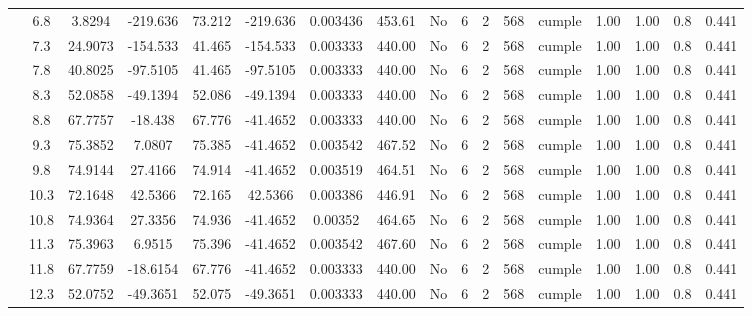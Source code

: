 \begin{table}[H]
{\begin{tabular}{|c|c|c|c|c|c|c|c|c|c|c|c|c|c|c|c|c|}
\cline{2-17}        & 6.8 & 3.8294 & -219.636 & 73.212 & -219.636 & 0.003436 & 453.61 & No  & 6   & 2   & 568 & \cellcolor[rgb]{ .776,  .937,  .808}cumple & 1.00 & 1.00 & 0.8 & 0.441 \bigstrut\\
\cline{2-17}        & 7.3 & 24.9073 & -154.533 & 41.465 & -154.533 & 0.003333 & 440.00 & No  & 6   & 2   & 568 & \cellcolor[rgb]{ .776,  .937,  .808}cumple & 1.00 & 1.00 & 0.8 & 0.441 \bigstrut\\
\cline{2-17}        & 7.8 & 40.8025 & -97.5105 & 41.465 & -97.5105 & 0.003333 & 440.00 & No  & 6   & 2   & 568 & \cellcolor[rgb]{ .776,  .937,  .808}cumple & 1.00 & 1.00 & 0.8 & 0.441 \bigstrut\\
\cline{2-17}        & 8.3 & 52.0858 & -49.1394 & 52.086 & -49.1394 & 0.003333 & 440.00 & No  & 6   & 2   & 568 & \cellcolor[rgb]{ .776,  .937,  .808}cumple & 1.00 & 1.00 & 0.8 & 0.441 \bigstrut\\
\cline{2-17}        & 8.8 & 67.7757 & -18.438 & 67.776 & -41.4652 & 0.003333 & 440.00 & No  & 6   & 2   & 568 & \cellcolor[rgb]{ .776,  .937,  .808}cumple & 1.00 & 1.00 & 0.8 & 0.441 \bigstrut\\
\cline{2-17}        & 9.3 & 75.3852 & 7.0807 & 75.385 & -41.4652 & 0.003542 & 467.52 & No  & 6   & 2   & 568 & \cellcolor[rgb]{ .776,  .937,  .808}cumple & 1.00 & 1.00 & 0.8 & 0.441 \bigstrut\\
\cline{2-17}        & 9.8 & 74.9144 & 27.4166 & 74.914 & -41.4652 & 0.003519 & 464.51 & No  & 6   & 2   & 568 & \cellcolor[rgb]{ .776,  .937,  .808}cumple & 1.00 & 1.00 & 0.8 & 0.441 \bigstrut\\
\cline{2-17}        & 10.3 & 72.1648 & 42.5366 & 72.165 & 42.5366 & 0.003386 & 446.91 & No  & 6   & 2   & 568 & \cellcolor[rgb]{ .776,  .937,  .808}cumple & 1.00 & 1.00 & 0.8 & 0.441 \bigstrut\\
\cline{2-17}        & 10.8 & 74.9364 & 27.3356 & 74.936 & -41.4652 & 0.00352 & 464.65 & No  & 6   & 2   & 568 & \cellcolor[rgb]{ .776,  .937,  .808}cumple & 1.00 & 1.00 & 0.8 & 0.441 \bigstrut\\
\cline{2-17}        & 11.3 & 75.3963 & 6.9515 & 75.396 & -41.4652 & 0.003542 & 467.60 & No  & 6   & 2   & 568 & \cellcolor[rgb]{ .776,  .937,  .808}cumple & 1.00 & 1.00 & 0.8 & 0.441 \bigstrut\\
\cline{2-17}        & 11.8 & 67.7759 & -18.6154 & 67.776 & -41.4652 & 0.003333 & 440.00 & No  & 6   & 2   & 568 & \cellcolor[rgb]{ .776,  .937,  .808}cumple & 1.00 & 1.00 & 0.8 & 0.441 \bigstrut\\
\cline{2-17}        & 12.3 & 52.0752 & -49.3651 & 52.075 & -49.3651 & 0.003333 & 440.00 & No  & 6   & 2   & 568 & \cellcolor[rgb]{ .776,  .937,  .808}cumple & 1.00 & 1.00 & 0.8 & 0.441 \bigstrut\\

\end{tabular}}
\end{table}
